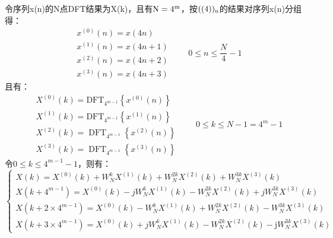 \documentclass{../source/Experiment}
\begin{document}
            令序列x(n)的N点DFT结果为X(k)，且有$\rm N=4^m$，按$\rm ((4))_n$的结果对序列x(n)分组得：
            $$
            \begin{aligned}
            &x^{(0)}(n)=x(4 n) \\
            &x^{(1)}(n)=x(4 n+1) \\
            &x^{(2)}(n)=x(4 n+2) \\
            &x^{(3)}(n)=x(4 n+3)
            \end{aligned}
            \qquad 0 \leqslant n \leqslant \frac{N}{4}-1
            $$
            且有：
            $$
            \begin{aligned}
            &X^{(0)}(k)=\mathrm{DFT}_{4^{m-1}}\left\{x^{(0)}(n)\right\} \\
            &X^{(1)}(k)=\mathrm{DFT}_{4^{m-1}}\left\{x^{(1)}(n)\right\} \\
            &X^{(2)}(k)=\operatorname{DFT}_{4^{m-1}}\left\{x^{(2)}(n)\right\} \\
            &X^{(3)}(k)=\operatorname{DFT}_{4^{m-1}}\left\{x^{(3)}(n)\right\}
            \end{aligned}
            \qquad 0 \leqslant k \leqslant N-1=4^{m}-1
            $$
            令$0 \leqslant k \leqslant 4^{m-1}-1$，则有：
            $$
            \left\{\begin{array}{l}
            X(k)=X^{(0)}(k)+W_{N}^{k} X^{(1)}(k)+W_{N}^{2 k} X^{(2)}(k)+W_{N}^{3 k} X^{(3)}(k) \\
            X\left(k+4^{m-1}\right)=X^{(0)}(k)-j W_{N}^{k} X^{(1)}(k)-W_{N}^{2 k} X^{(2)}(k)+j W_{N}^{3 k} X^{(3)}(k) \\
            X\left(k+2 \times 4^{m-1}\right)=X^{(0)}(k)-W_{N}^{k} X^{(1)}(k)+W_{N}^{2 k} X^{(2)}(k)-W_{N}^{3 k} X^{(3)}(k) \\
            X\left(k+3 \times 4^{m-1}\right)=X^{(0)}(k)+j W_{N}^{k} X^{(1)}(k)-W_{N}^{2 k} X^{(2)}(k)-\mathrm{j} W_{N}^{3 k} X^{(3)}(k)
            \end{array}\right.
            $$
\end{document}

